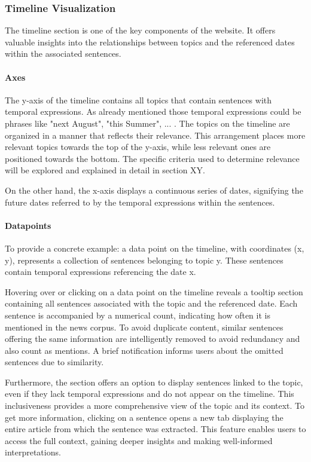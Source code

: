 \documentclass[a4paper,12pt]{report} %
\begin{document}
\subsubsection{Timeline Visualization}
 The timeline section is one of the key components of the website. It offers valuable insights into the relationships between topics and the referenced dates within the associated sentences.

\paragraph{Axes}
The y-axis of the timeline contains all topics that contain sentences with temporal expressions. As already mentioned those temporal expressions could be phrases like "next August", "this Summer", ... . The topics on the timeline are organized in a manner that reflects their relevance. This arrangement places more relevant topics towards the top of the y-axis, while less relevant ones are positioned towards the bottom. The specific criteria used to determine relevance will be explored and explained in detail in section XY.

On the other hand, the x-axis displays a continuous series of dates, signifying the future dates referred to by the temporal expressions within the sentences.

\paragraph{Datapoints}
To provide a concrete example: a data point on the timeline, with coordinates (x, y), represents a collection of sentences belonging to topic y. These sentences contain temporal expressions referencing the date x.

Hovering over or clicking on a data point on the timeline reveals a tooltip section containing all sentences associated with the topic and the referenced date. Each sentence is accompanied by a numerical count, indicating how often it is mentioned in the news corpus. To avoid duplicate content, similar sentences offering the same information are intelligently removed to avoid redundancy and also count as mentions. A brief notification informs users about the omitted sentences due to similarity.

Furthermore, the section offers an option to display sentences linked to the topic, even if they lack temporal expressions and do not appear on the timeline. This inclusiveness provides a more comprehensive view of the topic and its context. To get more information, clicking on a sentence opens a new tab displaying the entire article from which the sentence was extracted. This feature enables users to access the full context, gaining deeper insights and making well-informed interpretations.
\end{document}
